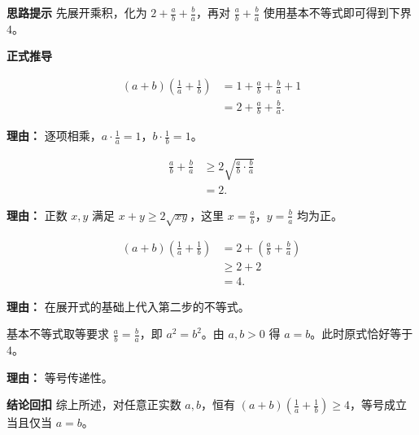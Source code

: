 \begin{proofbox}
	\textbf{\textcolor{CProof}{思路提示}}
	先展开乘积，化为 $2+\frac{a}{b}+\frac{b}{a}$，再对 $\frac{a}{b}+\frac{b}{a}$ 使用基本不等式即可得到下界 $4$。

	\medskip
	\textbf{\textcolor{CProof}{正式推导}}
	\begin{description}[style=nextline, leftmargin=2.8em, labelsep=0.5em, itemsep=0.55em]
		\item[\textbf{步骤一（多项式展开）：}]
			\[
				\begin{aligned}
					(a+b)\left(\frac{1}{a}+\frac{1}{b}\right) &= 1+\frac{a}{b}+\frac{b}{a}+1 \\ &= 2+\frac{a}{b}+\frac{b}{a}.
			\end{aligned}
			\]
			\par\textbf{理由：} 逐项相乘，$a\cdot\frac{1}{a}=1$，$b\cdot\frac{1}{b}=1$。
		\item[\textbf{步骤二（基本不等式）：}]
			\[
				\begin{aligned}
					\frac{a}{b}+\frac{b}{a} &\ge 2\sqrt{\frac{a}{b}\cdot\frac{b}{a}} \\ &= 2.
			\end{aligned}
			\]
			\par\textbf{理由：} 正数 $x,y$ 满足 $x+y\ge 2\sqrt{xy}$，这里 $x=\frac{a}{b}$，$y=\frac{b}{a}$ 均为正。
		\item[\textbf{步骤三（合并结论）：}]
			\[
				\begin{aligned}
					(a+b)\left(\frac{1}{a}+\frac{1}{b}\right) &= 2 + \left(\frac{a}{b}+\frac{b}{a}\right) \\ &\ge 2+2 \\ &= 4.
			\end{aligned}
			\]
			\par\textbf{理由：} 在展开式的基础上代入第二步的不等式。
		\item[\textbf{步骤四（等号条件）：}]
			基本不等式取等要求 $\frac{a}{b}=\frac{b}{a}$，即 $a^2=b^2$。由 $a,b>0$ 得 $a=b$。此时原式恰好等于 $4$。
			\par\textbf{理由：} 等号传递性。
	\end{description}

	\medskip
	\textbf{\textcolor{CProof}{结论回扣}}
	综上所述，对任意正实数 $a,b$，恒有 $(a+b)\left(\frac{1}{a}+\frac{1}{b}\right)\ge 4$，等号成立当且仅当 $a=b$。
\end{proofbox}

